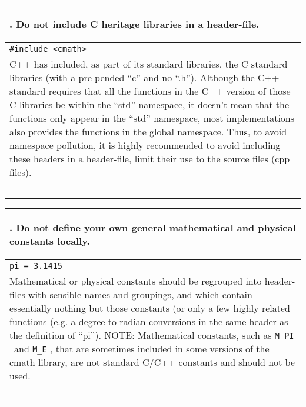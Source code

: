 \documentclass[10pt]{article}
\newenvironment{Mikael}{\color[rgb]{0.7,0.2,0.2}$\diamond$ Mikael: }{\color[rgb]{0,0,0}}
\newcommand{\MP}[1]{\begin{Mikael}#1\end{Mikael}}
\newcommand{\code}[1]{\color[rgb]{0.2,0.8,0.2}\texttt{#1}\color[rgb]{0,0,0} }
\newcounter {iCommandment}
\newcommand{\CorG}[5]
{
\begin{table}[H]
\begin{center}
\begin{tabular}{| p{12cm} |}
\hline
#1. #2 \\
\hline
\vspace{-0.1cm}
\parbox{12cm}{\code{#3}} \\
\vspace{-0.2cm}
#4 \\
#5 \\
\hline
\end{tabular}
\end{center}
\end{table}
}
\newcommand{\Commandment}[4]
{
\CorG{\textbf{\arabic{iCommandment}}\addtocounter{iCommandment}{1}}
{\textbf{#1}}{#2}{#3}{#4}
}
\begin{document}
\Commandment
{Do not include C heritage libraries in a header-file.}
{\#include <cmath>}
{C++ has included, as part of its standard libraries, the C standard libraries (with a pre-pended ``c'' and 
no ``.h''). Although the C++ standard requires that all the functions in the C++ version of those 
C libraries be within the ``std'' namespace, it doesn't mean that the functions only appear in the ``std''
namespace, most implementations also provides the functions in the global namespace. Thus, to avoid 
namespace pollution, it is highly recommended to avoid including these headers in a header-file, limit 
their use to the source files (cpp files).}
{\ }

\Commandment
{Do not define your own general mathematical and physical constants locally.}
{\sout{pi = 3.1415} }
{Mathematical or physical constants should be regrouped into header-files with sensible 
names and groupings, and which contain essentially nothing but those constants (or only a few 
highly related functions (e.g. a degree-to-radian conversions in the same header as the definition
of ``pi''). NOTE: Mathematical constants, such as \code{M\_PI}\ and \code{M\_E}, that are sometimes 
included in some versions of the cmath library, are not standard C/C++ constants and should not be used.}
{\ }

\end{document}
